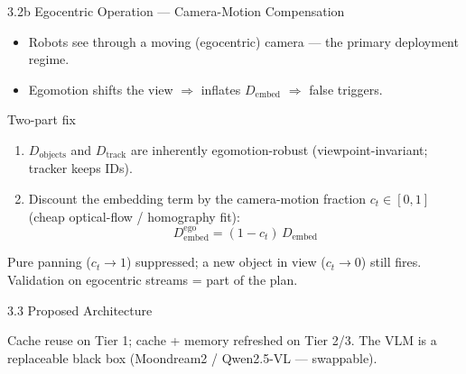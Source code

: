 \documentclass[11pt,aspectratio=169]{beamer}
\begin{document}
\begin{frame}{3.2b Egocentric Operation --- Camera-Motion Compensation}
\begin{itemize}
  \item Robots see through a \alert{moving (egocentric)} camera --- the primary deployment regime.
  \item Egomotion shifts the view $\Rightarrow$ inflates $D_{\text{embed}}$ $\Rightarrow$ \alert{false triggers}.
\end{itemize}
\begin{block}{Two-part fix}
\begin{enumerate}\footnotesize
  \item $D_{\text{objects}}$ and $D_{\text{track}}$ are inherently egomotion-robust (viewpoint-invariant; tracker keeps IDs).
  \item Discount the embedding term by the camera-motion fraction $c_t\in[0,1]$ (cheap optical-flow / homography fit):
  \[ D_{\text{embed}}^{\text{ego}} = (1-c_t)\,D_{\text{embed}} \]
\end{enumerate}
\end{block}
\centering\footnotesize Pure panning ($c_t\!\to\!1$) suppressed; a new object in view ($c_t\!\to\!0$) still fires. Validation on egocentric streams = part of the plan.
\end{frame}

\begin{frame}{3.3 Proposed Architecture}
\centering
{}

\vspace{2mm}
\footnotesize Cache reuse on Tier 1; cache + memory refreshed on Tier 2/3. The VLM is a replaceable black box (Moondream2 / Qwen2.5-VL --- swappable).
\end{frame}
\end{document}
